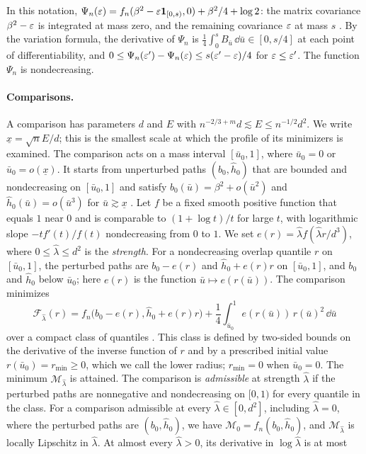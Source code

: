 In this notation, $\Psi_n(\varepsilon)=f_n(\beta^2-\varepsilon\mathbf 1_{[0,s)},0)+\beta^2/4+\log2$: the matrix covariance $\beta^2-\varepsilon$ is integrated at mass zero, and the remaining covariance $\varepsilon$ at mass $s$ \cite[Section~7, opening]{oai-fluctuations}. By the variation formula, the derivative of $\Psi_n$ is $\frac14\int_0^sB_{\bar u}\,\dd {\bar u}\in[0,s/4]$ at each point of differentiability, and $0\le\Psi_n(\varepsilon')-\Psi_n(\varepsilon)\le s(\varepsilon'-\varepsilon)/4$ for $\varepsilon\le\varepsilon'$. The function $\Psi_n$ is nondecreasing.

\paragraph{Comparisons.} A comparison \cite[Section~3.1, (3)--(6)]{oai-fluctuations} has parameters $d$ and $E$ with $n^{-2/3+m}d\lesssim E\le n^{-1/2}d^2$. We write $\underline x=\sqrt nE/d$; this is the smallest scale at which the profile of its minimizers is examined. The comparison acts on a mass interval $[{\bar u}_0,1]$, where ${\bar u}_0=0$ or ${\bar u}_0=o(\underline x)$. It starts from unperturbed paths $(b_0,{\widehat h}_0)$ that are bounded and nondecreasing on $[{\bar u}_0,1]$ and satisfy $b_0({\bar u})=\beta^2+o({\bar u}^2)$ and ${\widehat h}_0({\bar u})=o({\bar u}^3)$ for ${\bar u}\gtrsim\underline x$ \cite[(4)]{oai-fluctuations}. Let $f$ be a fixed smooth positive function that equals $1$ near $0$ and is comparable to $(1+\log t)/t$ for large $t$, with logarithmic slope $-tf'(t)/f(t)$ nondecreasing from $0$ to $1$. We set $e(r)={\widehat\lambda} f({\widehat\lambda} r/d^3)$, where $0\le{\widehat\lambda}\le d^2$ is the \emph{strength}. For a nondecreasing overlap quantile $r$ on $[{\bar u}_0,1]$, the perturbed paths are $b_0-e(r)$ and ${\widehat h}_0+e(r)r$ on $[{\bar u}_0,1]$, and $b_0$ and ${\widehat h}_0$ below ${\bar u}_0$; here $e(r)$ is the function ${\bar u}\mapsto e(r({\bar u}))$. The comparison minimizes
\[
 \mathcal F_{\widehat\lambda}(r)=f_n\bigl(b_0-e(r),{\widehat h}_0+e(r)r\bigr)+\frac14\int_{{\bar u}_0}^1e(r({\bar u}))\,r({\bar u})^2\,\dd {\bar u}
\]
over a compact class of quantiles \cite[(5)]{oai-fluctuations}. This class is defined by two-sided bounds on the derivative of the inverse function of $r$ and by a prescribed initial value $r({\bar u}_0)=r_{\min}\ge0$, which we call the lower radius; $r_{\min}=0$ when ${\bar u}_0=0$. The minimum $\mathcal M_{\widehat\lambda}$ is attained. The comparison is \emph{admissible} at strength ${\widehat\lambda}$ if the perturbed paths are nonnegative and nondecreasing on $[0,1)$ for every quantile in the class. For a comparison admissible at every ${\widehat\lambda}\in[0,d^2]$, including ${\widehat\lambda}=0$, where the perturbed paths are $(b_0,{\widehat h}_0)$, we have $\mathcal M_0=f_n(b_0,{\widehat h}_0)$, and $\mathcal M_{\widehat\lambda}$ is locally Lipschitz in ${\widehat\lambda}$. At almost every ${\widehat\lambda}>0$, its derivative in $\log{\widehat\lambda}$ is at most
